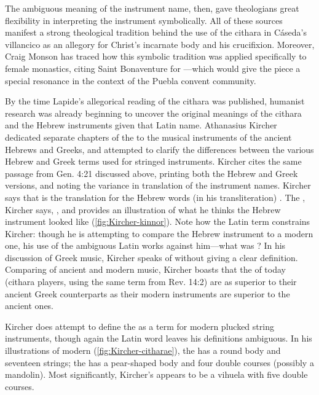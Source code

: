 The ambiguous meaning of the instrument name, then, gave theologians great
flexibility in interpreting the instrument symbolically.
All of these sources manifest a strong theological tradition behind the use of
the cithara in Cáseda's villancico as an allegory for Christ's incarnate body
and his crucifixion.  
Moreover, Craig Monson has traced how this symbolic tradition was applied
specifically to female monastics, citing Saint Bonaventure for ---which would give the piece a special resonance in the
context of the Puebla convent community.%
    \Autocite[93--94]{Monson:DivasConvent}

By the time Lapide's allegorical reading of the cithara was published, humanist
research was already beginning to uncover the original meanings of the cithara
and the Hebrew instruments given that Latin name.
Athanasius Kircher dedicated separate chapters of the  to the
musical instruments of the ancient Hebrews and Greeks, and attempted to clarify
the differences between the various Hebrew and Greek terms used for stringed
instruments.
Kircher cites the same passage from Gen. 4:21 discussed above, printing both
the Hebrew and Greek versions, and noting the variance in translation of the
instrument names.
Kircher says that  is the translation for the Hebrew words (in
his transliteration) .
The , Kircher says, , and provides an illustration of what he thinks
the Hebrew instrument looked like (\cref{fig:Kircher-kinnor}).%
    \autocite[]{Kircher:Musurgia} 
Note how the Latin term constrains Kircher: though he is attempting to compare
the Hebrew instrument to a modern one, his use of the ambiguous Latin
 works against him---what was ?
In his discussion of Greek music, Kircher speaks of  without
giving a clear definition.
Comparing of ancient and modern music, Kircher boasts that the
 of today (cithara players, using the same term from Rev.
14:2) are as superior to their ancient Greek counterparts as their modern
instruments are superior to the ancient ones.
    \Autocite[]{Kircher:Musurgia}

Kircher does attempt to define the  as a term for modern
plucked string instruments, though again the Latin word leaves his definitions
ambiguous.
In his illustrations of modern  (\cref{fig:Kircher-citharae}),
the  has a round body and seventeen strings; the
 has a pear-shaped body and four double
courses (possibly a mandolin).
Most significantly, Kircher's  appears to be a vihuela
with five double courses.

